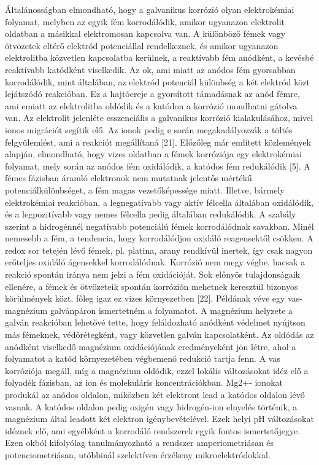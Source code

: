 Általánosságban elmondható, hogy a galvanikus korrózió olyan elektrokémiai folyamat, melyben az egyik fém korrodálódik, amikor ugyanazon elektrolit oldatban a másikkal elektromosan kapcsolva van. A különböző fémek vagy ötvözetek eltérő elektród potenciállal rendelkeznek, és amikor ugyanazon elektrolitba közvetlen kapcsolatba kerülnek, a reaktívabb fém anódként, a kevésbé reaktívabb katódként viselkedik. Az ok, ami miatt az anódos fém gyorsabban korrodálódik, mint általában, az elektród potenciál különbség a két elektród közt lejátszódó reakcióban. Ez a hajtóereje a gyorsított támadásnak az anód fémre, ami emiatt az elektrolitba oldódik és a katódon a korrózió mondhatni gátolva van. Az elektrolit jelenléte esszenciális a galvanikus korrózió kialakulásához, mivel ionos migrációt segítik elő. Az ionok pedig e során megakadályozzák a töltés felgyülemlést, ami a reakciót megállítaná [21]. 
Előzőleg már említett közlemények alapján, elmondható, hogy vizes oldatban a fémek korróziója egy elektrokémiai folyamat, mely során az anódos fém oxidálódik, a katódos fém redukálódik [5]. A fémes fázisban áramló elektronok nem mutatnak jelentős mértékű potenciálkülönbséget, a fém magas vezetőképessége miatt. Illetve, bármely elektrokémiai reakcióban, a legnegatívabb vagy aktív félcella általában oxidálódik, és a legpozitívabb vagy nemes félcella pedig általában redukálódik. A szabály szerint a hidrogénnél negatívabb potenciálú fémek korrodálódnak savakban. Minél nemesebb a fém, a tendencia, hogy korrodálódjon oxidáló reagensektől csökken. A redox sor tetején lévő fémek, pl. platina, arany rendkívül inertek, így csak nagyon erőteljes oxidáló ágensekkel korrodálódnak. Korrózió nem megy végbe, hacsak a reakció spontán iránya nem jelzi a fém oxidációját.
Sok előnyös tulajdonságaik ellenére, a fémek és ötvözeteik spontán korrózión mehetnek keresztül bizonyos körülmények közt, főleg igaz ez vizes környezetben [22]. Példának véve egy vas-magnézium galvánpáron ismertetném a folyamatot. A magnézium helyzete a galván reakcióban lehetővé tette, hogy feláldozható anódként védelmet nyújtson más fémeknek, védőrétegként, vagy közvetlen galván kapcsolatként. Az oldódás az anódként viselkedő magnézium oxidációjának eredményeként jön létre, ahol a folyamatot a katód környezetében végbemenő redukció tartja fenn. A vas korróziója megáll, míg a magnézium oldódik, ezzel lokális változásokat idéz elő a folyadék fázisban, az ion és molekuláris koncentrációkban. Mg2+- ionokat produkál az anódos oldalon, miközben két elektront lead a katódos oldalon lévő vasnak. A katódos oldalon pedig oxigén vagy hidrogén-ion elnyelés történik, a magnézium által leadott két elektron igénybevételével. Ezek helyi pH változásokat idéznek elő, ami egyébként a korrodáló rendszerek egyik fontos ismertetőjegye.  Ezen okból kifolyólag tanulmányozható a rendszer amperiometriásan és potenciometriásan, utóbbinál szelektíven érzékeny mikroelektródokkal.
